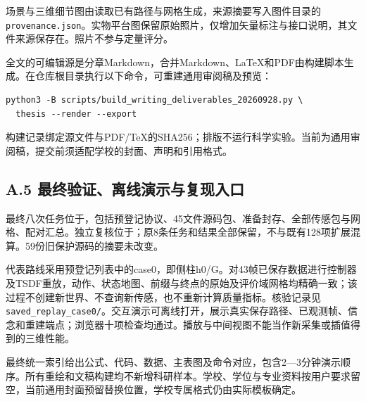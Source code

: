 \documentclass[11pt,a4paper]{article}
\numberwithin{equation}{section}
\begin{document}
场景与三维细节图由读取已有路径与网格生成，来源摘要写入图件目录的\texttt{provenance.json}。实物平台图保留原始照片，仅增加矢量标注与接口说明，其文件来源保存在。照片不参与定量评分。

全文的可编辑源是分章Markdown，合并Markdown、LaTeX和PDF由构建脚本生成。在仓库根目录执行以下命令，可重建通用审阅稿及预览：

\par\medskip\noindent\begin{minipage}{\linewidth}
\begin{verbatim}
python3 -B scripts/build_writing_deliverables_20260928.py \
  thesis --render --export
\end{verbatim}
\end{minipage}\par\medskip


构建记录绑定源文件与PDF/TeX的SHA256；排版不运行科学实验。当前为通用审阅稿，提交前须适配学校的封面、声明和引用格式。

\hypertarget{a.5-ux6700ux7ec8ux9a8cux8bc1ux79bbux7ebfux6f14ux793aux4e0eux590dux73b0ux5165ux53e3}{%
\subsection*{A.5 最终验证、离线演示与复现入口}\label{a.5-ux6700ux7ec8ux9a8cux8bc1ux79bbux7ebfux6f14ux793aux4e0eux590dux73b0ux5165ux53e3}}

最终八次任务位于，包括预登记协议、45文件源码包、准备封存、全部传感包与网格、配对汇总。独立复核位于；原8条任务和结果全部保留，不与既有128项扩展混算。59份旧保护源码的摘要未改变。

代表路线采用预登记列表中的case0，即侧柱h0/G。对43帧已保存数据进行控制器及TSDF重放，动作、状态地图、前缀与终点的原始及评价域网格均精确一致；该过程不创建新世界、不查询新传感，也不重新计算质量指标。核验记录见\texttt{saved\_replay\_case0/}。交互演示可离线打开，展示真实保存路径、已观测帧、信念和重建端点；浏览器十项检查均通过。播放与中间视图不能当作新采集或插值得到的三维性能。

最终统一索引给出公式、代码、数据、主表图及命令对应，包含2---3分钟演示顺序。所有重绘和文稿构建均不新增科研样本。学校、学位与专业资料按用户要求留空，当前通用封面预留替换位置，学校专属格式仍由实际模板确定。
\end{document}
